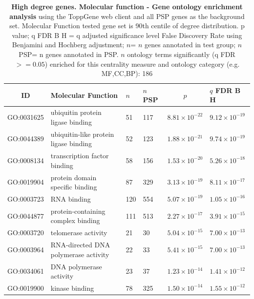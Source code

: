 \begin{table}[ht]
\centering
\begin{adjustbox}{width=\textwidth}
\setlength{\extrarowheight}{2pt}

\begin{tabular}{@{}clllcl@{}}
  \toprule
ID & Molecular Function & $n$ & $n$ PSP & $p$ & $q$ FDR B H \\ 
  \midrule
GO:0031625 & ubiquitin protein ligase binding & 51 & 117 & $8.81 \times 10^{-22}$ & $9.12 \times 10^{-19}$ \\ 
  GO:0044389 & ubiquitin-like protein ligase binding & 52 & 123 & $1.88 \times 10^{-21}$ & $9.74 \times 10^{-19}$ \\ 
  GO:0008134 & transcription factor binding & 58 & 156 & $1.53 \times 10^{-20}$ & $5.26 \times 10^{-18}$ \\ 
  GO:0019904 & protein domain specific binding & 87 & 329 & $3.13 \times 10^{-19}$ & $8.11 \times 10^{-17}$ \\ 
  GO:0003723 & RNA binding & 120 & 554 & $5.07 \times 10^{-19}$ & $1.05 \times 10^{-16}$ \\ 
  GO:0044877 & protein-containing complex binding & 111 & 513 & $2.27 \times 10^{-17}$ & $3.91 \times 10^{-15}$ \\ 
  GO:0003720 & telomerase activity & 21 & 30 & $5.04 \times 10^{-15}$ & $7.00 \times 10^{-13}$ \\ 
  GO:0003964 & RNA-directed DNA polymerase activity & 22 & 33 & $5.41 \times 10^{-15}$ & $7.00 \times 10^{-13}$ \\ 
  GO:0034061 & DNA polymerase activity & 23 & 37 & $1.23 \times 10^{-14}$ & $1.41 \times 10^{-12}$ \\ 
  GO:0019900 & kinase binding & 78 & 325 & $1.50 \times 10^{-14}$ & $1.55 \times 10^{-12}$ \\ 
   \bottomrule
\end{tabular}
\end{adjustbox}
\caption[Gene ontology Molecular Function enrichment of genes above 90th centile of degree distribution]{\textbf{High degree genes. Molecular function - Gene ontology enrichment analysis} using the ToppGene web client and all PSP genes as the background set.  Molecular Function tested gene set is 90th centile of degree distribution.  p value; q FDR B H = q adjusted significance level False Discovery Rate using Benjamini and Hochberg adjustment; $n$= $n$ genes annotated in test group; $n$ PSP= n genes annotated in PSP. $n$ ontology terms significantly (q FDR$>=0.05$) enriched for this centrality measure and ontology category (e.g. MF,CC,BP): 186} 
\label{tab:ToppGENE GO: Molecular Function. 90 centile cwpsp.txtp = p value; q FDR B H = q adjusted significance level False Discovery Rate using Benjamini and Hochberg adjustment; n= n genes annotated in test group; n PSP= n genes annotated in PSP. n significant in category 186}
\end{table}
